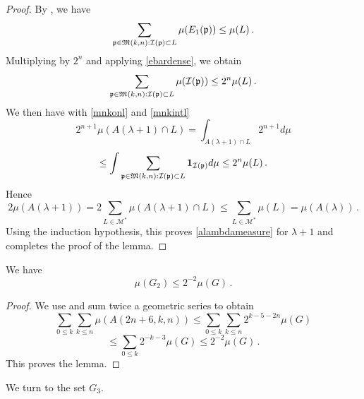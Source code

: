 \begin{proof}
By , we have
\begin{equation}
\sum_{{\mathfrak p} \in {\mathfrak{M}}(k,n):{\mathcal{I}}({\mathfrak p}) \subset L} \mu({E_1}({\mathfrak p})) \leq \mu(L)\, .
\end{equation}
Multiplying by $2^n$ and applying \eqref{ebardense}, we obtain
\begin{equation}\label{mnkintl}
    \sum_{{\mathfrak p} \in {\mathfrak{M}}(k,n):{\mathcal{I}}({\mathfrak p}) \subset L} \mu({\mathcal{I}}({\mathfrak p})) \leq 2^n \mu(L)\, .
\end{equation}
We then have with \eqref{mnkonl} and \eqref{mnkintl}
\begin{equation}
2^{n+1}\mu(A(\lambda+1)\cap L) =
 \int_{A(\lambda+1)\cap L} 2^{n+1} d\mu
\end{equation}
\begin{equation}
\le
    \int \sum_{{\mathfrak p} \in {\mathfrak{M}}(k,n):{\mathcal{I}}({\mathfrak p}) \subset L} \mathbf{1}_{{\mathcal{I}}({\mathfrak p})} d\mu
\le 2^n \mu(L)\, .
\end{equation}
Hence
\begin{equation}
    2\mu(A(\lambda+1))=2\sum_{L\in \mathcal{M}^*}
\mu(A(\lambda+1)\cap L)\le
\sum_{L\in \mathcal{M}^*}\mu( L)= \mu(A(\lambda))\, .
\end{equation}
Using the induction hypothesis, this proves
\eqref{alambdameasure} for $\lambda+1$ and completes the proof of the lemma.
\end{proof}

\begin{lemma}
\label{second-exception}
\leanok
{}
We have
\begin{equation}
    \mu(G_2)\le 2^{-2} \mu(G)\, .
\end{equation}
\end{lemma}
\begin{proof}
\leanok
We use  and sum twice a geometric series
to obtain
\begin{equation}
    \sum_{0\le k}\sum_{k\le n}
\mu(A(2n+6,k,n))\le \sum_{0\le k}\sum_{k\le n} 2^{k-5-2n}\mu(G)
\end{equation}
\begin{equation}
   \le \sum_{0\le k} 2^{-k-3}\mu(G)\le 2^{-2}\mu(G)\, .
\end{equation}
This proves the lemma.
\end{proof}


We turn to the set $G_3$.

